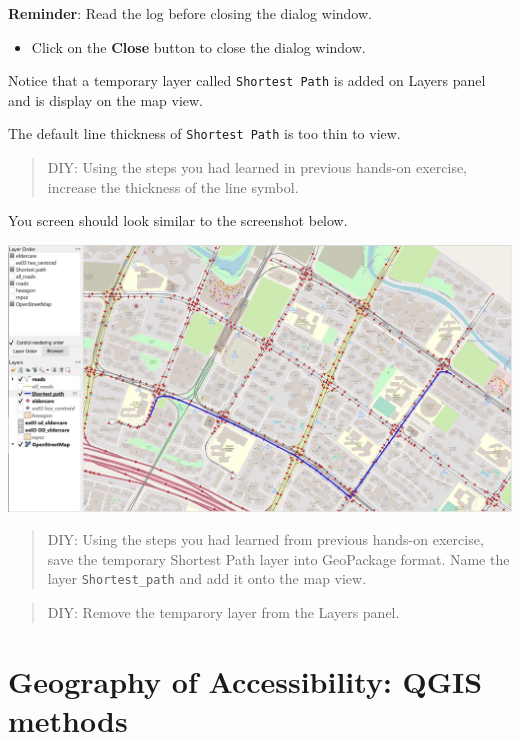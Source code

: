 \documentclass[
  letterpaper,
  DIV=11,
  numbers=noendperiod]{scrreprt}
\providecommand{\tightlist}{%
  \setlength{\itemsep}{0pt}\setlength{\parskip}{0pt}}\usepackage{longtable,booktabs,array}
\begin{document}
\textbf{Reminder}: Read the log before closing the dialog window.

\begin{itemize}
\tightlist
\item
  Click on the \textbf{Close} button to close the dialog window.
\end{itemize}

Notice that a temporary layer called \texttt{Shortest\ Path} is added on
Layers panel and is display on the map view.

The default line thickness of \texttt{Shortest\ Path} is too thin to
view.

\begin{quote}
DIY: Using the steps you had learned in previous hands-on exercise,
increase the thickness of the line symbol.
\end{quote}

You screen should look similar to the screenshot below.

\includegraphics{./img09/image24.jpg}

\begin{quote}
DIY: Using the steps you had learned from previous hands-on exercise,
save the temporary Shortest Path layer into GeoPackage format. Name the
layer \texttt{Shortest\_path} and add it onto the map view.
\end{quote}

\begin{quote}
DIY: Remove the temparory layer from the Layers panel.
\end{quote}


\hypertarget{geography-of-accessibility-qgis-methods}{%
\chapter{Geography of Accessibility: QGIS
methods}\label{geography-of-accessibility-qgis-methods}}
\end{document}
